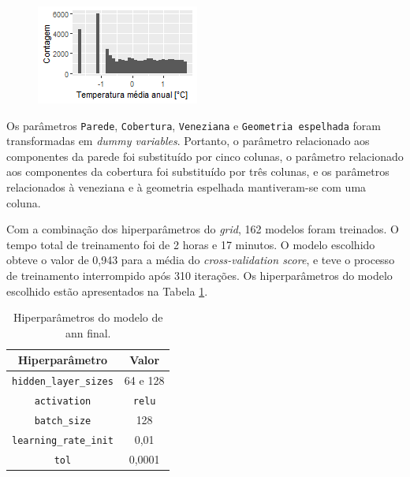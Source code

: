 \documentclass{article}
\begin{document}
\begin{figure}[h!]
\begin{minipage}{.33\textwidth}
	\end{minipage}%
	\begin{minipage}{.33\textwidth}
		\centering
		\includegraphics[width=\linewidth]{zscore_plot_DBT.png}
	\end{minipage}
\end{figure}

Os parâmetros \texttt{Parede}, \texttt{Cobertura}, \texttt{Veneziana} e \texttt{Geometria espelhada} foram transformadas em \textit{dummy variables}. Portanto, o parâmetro relacionado aos componentes da parede foi substituído por cinco colunas, o parâmetro relacionado aos componentes da cobertura foi substituído por três colunas, e os parâmetros relacionados à veneziana e à geometria espelhada mantiveram-se com uma coluna.

Com a combinação dos hiperparâmetros do \textit{grid}, 162 modelos foram treinados. 
O tempo total de treinamento foi de 2 horas e 17 minutos.
O modelo escolhido obteve o valor de 0,943 para a média do \textit{cross-validation score}, e teve o processo de treinamento interrompido após 310 iterações. Os hiperparâmetros do modelo escolhido estão apresentados na Tabela \ref{table:bestr2ann}.

\begin{table}[!htb]
	\centering
	\caption{Hiperparâmetros do modelo de \acrshort{ann} final.}
	\label{table:bestr2ann}
	\begin{tabular}{|c |c |}
		\hline
		\textbf{Hiperparâmetro} & \textbf{Valor} \\
		\hline
		\texttt{hidden\_layer\_sizes} & 64 e 128 \\
		\hline
		\texttt{activation} & \texttt{relu} \\
		\hline
		\texttt{batch\_size} & 128 \\
		\hline
		\texttt{learning\_rate\_init} & 0,01 \\
		\hline
		\texttt{tol} & 0,0001 \\
		\hline
	\end{tabular}\\
\end{table}
\end{document}
